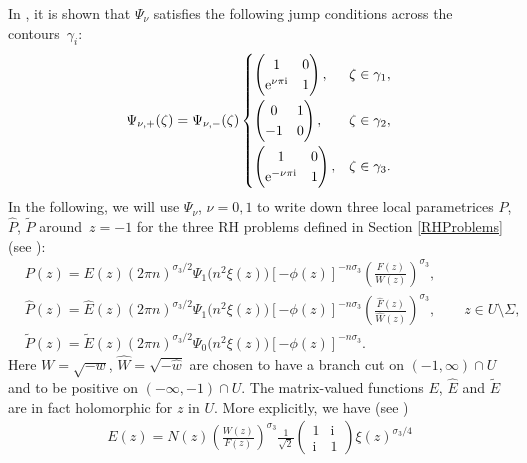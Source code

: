 \documentclass[11pt]{article}
\numberwithin{equation}{section}
\newcommand{\hw}{\widehat w}
\newcommand{\bP}{P}
\newcommand{\hP}{{\widehat P}}
\newcommand{\tP}{{\widetilde P}}
\newcommand{\hF}{\widehat F}
\newcommand{\I}{\mathrm{i}}
\newcommand{\E}{\mathrm{e}}
\numberwithin{equation}{section}
\begin{document}
In \cite[Section~6]{KMVV}, it is shown that $\Psi_\nu$ satisfies the following jump conditions across the contours~$\gamma_i$:
\begin{align*}
 \Psi_{\nu,+}(\zeta) = \Psi_{\nu,-}(\zeta)
 \begin{cases}
 \begin{pmatrix}
 1 & 0
 \\
 \E^{\nu\pi\I} & 1
 \end{pmatrix}, &\zeta \in \gamma_1,\vspace{1mm}
 \\
 \begin{pmatrix}
 0 & 1
 \\
 -1 & 0
 \end{pmatrix}, &\zeta \in \gamma_2,\vspace{1mm}
 \\
 \begin{pmatrix}
 1 & 0
 \\
 \E^{-\nu\pi\I} & 1
 \end{pmatrix}, &\zeta \in \gamma_3.
 \end{cases}
\end{align*}
In the following, we will use $\Psi_\nu$, $\nu = 0,1$ to write down three local parametrices $P$, $\hP$, $\tP$ around~$z = -1$ for the three RH problems defined in Section \ref{RHProblems} (see \cite[equation~(6.52)]{KMVV}):
\begin{align*}%
& \bP(z)= E(z)(2\pi n)^{\sigma_3/2} \Psi_1\big(n^2 \xi(z)\big) [-\phi(z)]^{-n\sigma_3}\left(\frac{F(z)}{W(z)}\right)^{\sigma_3},
 \\
& \hP(z)= \widehat E(z)(2\pi n)^{\sigma_3/2} \Psi_1\big(n^2 \xi(z)\big) [-\phi(z)]^{-n\sigma_3}\left(\frac{\hF(z)}{\widehat W(z)}\right)^{\sigma_3}, \qquad z \in U \setminus \Sigma,
 \\
& \tP(z)= \widetilde E(z)(2\pi n)^{\sigma_3/2} \Psi_0\big(n^2 \xi(z)\big) [-\phi(z)]^{-n\sigma_3}.
\end{align*}
Here $W = \sqrt{-w}$, $\widehat W = \sqrt{-\hw}$ are chosen to have a branch cut on $(-1,\infty)\cap U$ and to be positive on $(-\infty, -1)\cap U$. The matrix-valued functions $E$, $\widehat E$ and $\widetilde E$ are in fact holomorphic for $z$ in $U$. More explicitly, we have (see \cite[equation~(6.53)]{KMVV})
\begin{align}\label{formulaE}
 E(z) = N(z)\left(\frac{W(z)}{F(z)}\right)^{\sigma_3}\frac{1}{\sqrt{2}}
 \begin{pmatrix}
 1 & \I
 \\
 \I & 1
 \end{pmatrix}\xi(z)^{\sigma_3/4}
\end{align}
\end{document}
